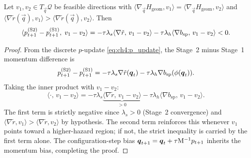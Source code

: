 \begin{lemma}
\label{app:lem:risk_deflect}
Let $v_1,v_2\in T_{\vec{q}}\mathcal{Q}$ be feasible directions with
$\langle\nabla_{\vec{q}}H_{\mathrm{geom}},v_1\rangle =
 \langle\nabla_{\vec{q}}H_{\mathrm{geom}},v_2\rangle$
and
$\langle\nabla\tilde{r}(\vec{q}),v_1\rangle >
 \langle\nabla\tilde{r}(\vec{q}),v_2\rangle$.
Then
\[
  \langle p_{t+1}^{(\mathrm{S2})}-p_{t+1}^{(\mathrm{S1})},\;
         v_1-v_2\rangle
  = -\tau\lambda_s\langle\nabla\tilde{r},\,v_1-v_2\rangle
    -\tau\lambda_h\langle\nabla b_{\mathrm{sp}},\,v_1-v_2\rangle
  < 0.
\]
\end{lemma}
\begin{proof}
From the discrete $p$-update \eqref{eq:ch4:p_update}, the
Stage~2 minus Stage~1 momentum difference is
\[
  p_{t+1}^{(\mathrm{S2})}-p_{t+1}^{(\mathrm{S1})}
  = -\tau\lambda_s\nabla\tilde{r}(\boldsymbol{q}_t)
    -\tau\lambda_h\nabla b_{\mathrm{sp}}(\phi(\boldsymbol{q}_t)).
\]
Taking the inner product with $v_1-v_2$:
\[
  \langle\cdot,\,v_1-v_2\rangle
  = -\tau\lambda_s\underbrace{
      \langle\nabla\tilde{r},\,v_1-v_2\rangle}_{>0}
    -\tau\lambda_h\langle\nabla b_{\mathrm{sp}},\,v_1-v_2\rangle.
\]
The first term is strictly negative since $\lambda_s>0$ (Stage~2
convergence) and $\langle\nabla\tilde{r},v_1\rangle>
\langle\nabla\tilde{r},v_2\rangle$ by hypothesis.
The second term reinforces this whenever $v_1$ points toward a
higher-hazard region; if not, the strict inequality is carried by the
first term alone.
The configuration-step bias
$\boldsymbol{q}_{t+1}=\boldsymbol{q}_t+\tau\mathrm{M}^{-1}p_{t+1}$
inherits the momentum bias, completing the proof.
\end{proof}

